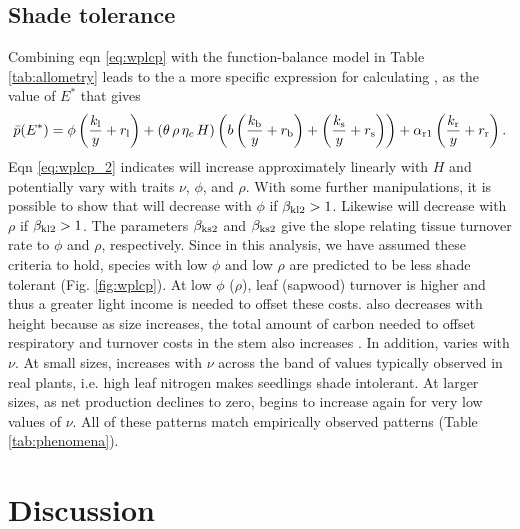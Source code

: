 \documentclass[a4paper,11pt]{article}
\begin{document}
\subsection{Shade tolerance}
Combining eqn \ref{eq:wplcp} with the function-balance model in Table \ref{tab:allometry} leads to the a more specific expression for calculating {\wplcp}, as the value of $E^*$ that gives
\begin{equation}\label{eq:wplcp_2}
\bar{p}(E^*) =
      \phi \left(\frac{k_{\rm l}}{y} + r_{\rm l}\right) +
      \left(\theta \, \rho \, \eta_c \, H\right)
        \left(b\left(\frac{k_{\rm b}}{y} + r_{\rm b}\right)
            + \left(\frac{k_{\rm s}}{y} + r_{\rm s}\right)\right) +
      \alpha_{\rm r1} \left(\frac{k_{\rm r}}{y} + r_{\rm r}\right).
\end{equation}
Eqn \ref{eq:wplcp_2} indicates {\wplcp} will increase approximately linearly with $H$ and potentially vary with traits $\nu$, $\phi$, and $\rho$. With some further manipulations, it is possible to show that {\wplcp} will decrease with $\phi$ if $\beta_{{\rm kl2}} >1$. Likewise {\wplcp} will decrease with $\rho$ if $\beta_{{\rm kl2}} >1$. The parameters $\beta_{{\rm ks2}}$ and $\beta_{{\rm ks2}}$ give the slope relating tissue turnover rate to $\phi$ and $\rho$, respectively. Since in this analysis, we have assumed these criteria to hold, species with low $\phi$ and low $\rho$ are predicted to be less shade tolerant (Fig. \ref{fig:wplcp}). At low $\phi$ ($\rho$), leaf (sapwood) turnover is higher and thus a greater light income is needed to offset these costs. {\wplcp} also decreases with height because as size increases, the total amount of carbon needed to offset respiratory and turnover costs in the stem also increases \citep{Givnish-1988}. In addition, {\wplcp} varies with $\nu$. At small sizes, {\wplcp} increases with $\nu$ across the band of values typically observed in real plants, i.e. high leaf nitrogen makes seedlings shade intolerant. At larger sizes, as net production declines to zero, {\wplcp} begins to increase again for very low values of $\nu$. All of these patterns match empirically observed patterns (Table \ref{tab:phenomena}).

\section{Discussion}
\end{document}
